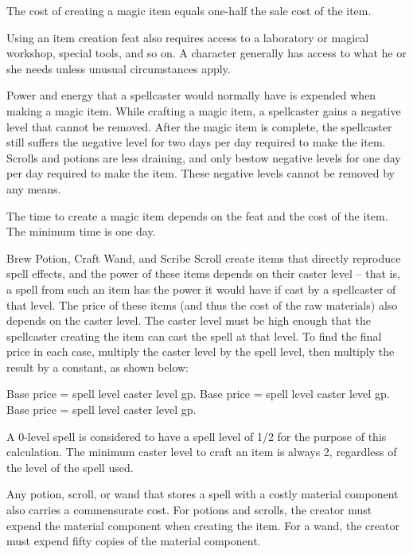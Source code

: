 The cost of creating a magic item equals one-half the sale cost of the item.

Using an item creation feat also requires access to a laboratory or magical workshop, special tools, and so on. A character generally has access to what he or she needs unless unusual circumstances apply.

 Power and energy that a spellcaster would normally have is expended when making a magic item. While crafting a magic item, a spellcaster gains a negative level that cannot be removed. After the magic item is complete, the spellcaster still suffers the negative level for two days per day required to make the item. Scrolls and potions are less draining, and only bestow negative levels for one day per day required to make the item. These negative levels cannot be removed by any means.

 The time to create a magic item depends on the feat and the cost of the item. The minimum time is one day.

 Brew Potion, Craft Wand, and Scribe Scroll create items that directly reproduce spell effects, and the power of these items depends on their caster level -- that is, a spell from such an item has the power it would have if cast by a spellcaster of that level. The price of these items (and thus the cost of the raw materials) also depends on the caster level. The caster level must be high enough that the spellcaster creating the item can cast the spell at that level. To find the final price in each case, multiply the caster level by the spell level, then multiply the result by a constant, as shown below:

 Base price = spell level \mtimes caster level  gp.
 Base price = spell level \mtimes  caster level  gp.
 Base price = spell level \mtimes  caster level  gp.

\par A 0-level spell is considered to have a spell level of 1/2 for the
purpose of this calculation. The minimum caster level to craft an item is always 2, regardless of the level of the spell used.

 Any potion, scroll, or wand that stores a spell with a costly material component also carries a commensurate cost. For potions and scrolls, the creator must expend the material component when creating the item. For a wand, the creator must expend fifty copies of the material component.


